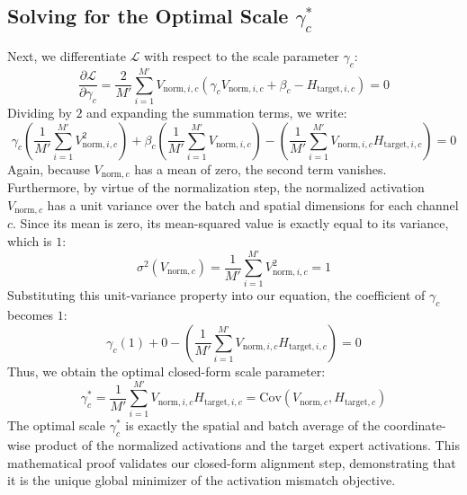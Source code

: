 \documentclass{article}
\theoremstyle{plain}
\theoremstyle{definition}
\theoremstyle{remark}
\begin{document}
\subsection{Solving for the Optimal Scale $\gamma_c^*$}
Next, we differentiate $\mathcal{L}$ with respect to the scale parameter $\gamma_c$:
\begin{equation}
    \frac{\partial \mathcal{L}}{\partial \gamma_c} = \frac{2}{M'} \sum_{i=1}^{M'} V_{\text{norm}, i, c} \left( \gamma_c V_{\text{norm}, i, c} + \beta_c - H_{\text{target}, i, c} \right) = 0
\end{equation}
Dividing by $2$ and expanding the summation terms, we write:
\begin{equation}
    \gamma_c \left( \frac{1}{M'} \sum_{i=1}^{M'} V_{\text{norm}, i, c}^2 \right) + \beta_c \left( \frac{1}{M'} \sum_{i=1}^{M'} V_{\text{norm}, i, c} \right) - \left( \frac{1}{M'} \sum_{i=1}^{M'} V_{\text{norm}, i, c} H_{\text{target}, i, c} \right) = 0
\end{equation}
Again, because $V_{\text{norm}, c}$ has a mean of zero, the second term vanishes. Furthermore, by virtue of the normalization step, the normalized activation $V_{\text{norm}, c}$ has a unit variance over the batch and spatial dimensions for each channel $c$. Since its mean is zero, its mean-squared value is exactly equal to its variance, which is $1$:
\begin{equation}
    \sigma^2(V_{\text{norm}, c}) = \frac{1}{M'} \sum_{i=1}^{M'} V_{\text{norm}, i, c}^2 = 1
\end{equation}
Substituting this unit-variance property into our equation, the coefficient of $\gamma_c$ becomes $1$:
\begin{equation}
    \gamma_c (1) + 0 - \left( \frac{1}{M'} \sum_{i=1}^{M'} V_{\text{norm}, i, c} H_{\text{target}, i, c} \right) = 0
\end{equation}
Thus, we obtain the optimal closed-form scale parameter:
\begin{equation}
    \gamma_c^* = \frac{1}{M'} \sum_{i=1}^{M'} V_{\text{norm}, i, c} H_{\text{target}, i, c} = \text{Cov}(V_{\text{norm}, c}, H_{\text{target}, c})
\end{equation}
The optimal scale $\gamma_c^*$ is exactly the spatial and batch average of the coordinate-wise product of the normalized activations and the target expert activations. This mathematical proof validates our closed-form alignment step, demonstrating that it is the unique global minimizer of the activation mismatch objective.
\end{document}
